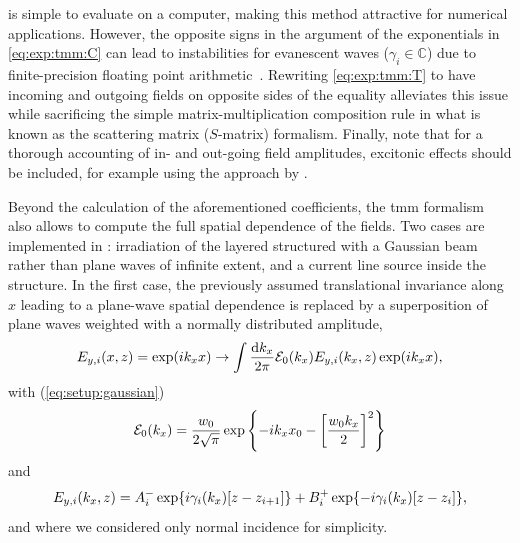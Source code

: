  is simple to evaluate on a computer, making this method attractive for numerical applications.
However, the opposite signs in the argument of the exponentials in \cref{eq:exp:tmm:C} can lead to instabilities for evanescent waves ($\gamma_i\in\mathbb{C}$) due to finite-precision floating point arithmetic~\cite{Duetz}.
Rewriting \cref{eq:exp:tmm:T} to have incoming and outgoing fields on opposite sides of the equality alleviates this issue while sacrificing the simple matrix-multiplication composition rule in what is known as the scattering matrix ($S$-matrix) formalism.
Finally, note that for a thorough accounting of in- and out-going field amplitudes, excitonic effects should be included, for example using the approach by \citet{DAndrea1990}.

Beyond the calculation of the aforementioned coefficients, the \gls{tmm} formalism also allows to compute the full spatial dependence of the fields.
Two cases are implemented in \pymoosh: irradiation of the layered structured with a Gaussian beam rather than plane waves of infinite extent, and a current line source inside the structure.
In the first case, the previously assumed translational invariance along $x$ leading to a plane-wave spatial dependence is replaced by a superposition of plane waves weighted with a normally distributed amplitude,
\begin{equation}\label{eq:exp:tmm:gauss:x}
    E_{y,i}(x,z) = \exp(i k_x x)\rightarrow \int\frac{\dd{k_x}}{2\pi}\mathcal{E}_0(k_x) E_{y,i}(k_x, z)\exp(i k_x x),
\end{equation}
with (\cf \cref{eq:setup:gaussian})
\begin{equation}\label{eq:exp:tmm:gauss:ampl}
    \mathcal{E}_0(k_x) = \frac{w_0}{2\sqrt{\pi}}\exp\left\lbrace - i k_x x_0 -\left[\frac{w_0 k_x}{2}\right]^2\right\rbrace
\end{equation}
and
\begin{equation}\label{eq:exp:tmm:gauss:z}
    E_{y,i}(k_x, z) = A_{i}^{-}\exp\lbrace i\gamma_i(k_x)[z-z_{i+1}]\rbrace + B_{i}^{+}\exp\lbrace -i\gamma_i(k_x)[z-z_{i}]\rbrace,
\end{equation}
and where we considered only normal incidence for simplicity.

